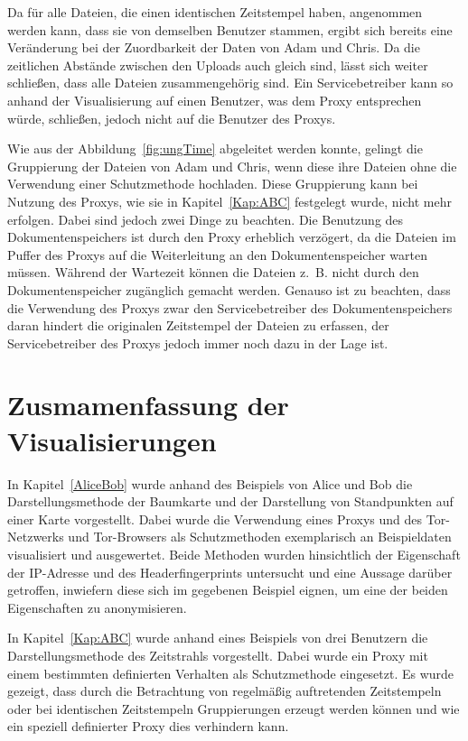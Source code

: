 \documentclass[
    fontsize=12pt,
    headings=small,
    parskip=half,           %
    bibliography=totoc,
    numbers=noenddot,       %
    open=any,               %
    ]{scrreprt}
\begin{document}
Da für alle Dateien, die einen identischen Zeitstempel haben, angenommen werden kann, dass sie von demselben Benutzer stammen, ergibt sich bereits eine Veränderung bei der Zuordbarkeit der Daten von Adam und Chris.
Da die zeitlichen Abstände zwischen den Uploads auch gleich sind, lässt sich weiter schließen, dass alle Dateien zusammengehörig sind.
Ein Servicebetreiber kann so anhand der Visualisierung auf einen Benutzer, was dem Proxy entsprechen würde, schließen, jedoch nicht auf die Benutzer des Proxys.

Wie aus der Abbildung~\ref{fig:ungTime} abgeleitet werden konnte, gelingt die Gruppierung der Dateien von Adam und Chris, wenn diese ihre Dateien ohne die Verwendung einer Schutzmethode hochladen.
Diese Gruppierung kann bei Nutzung des Proxys, wie sie in Kapitel~\ref{Kap:ABC} festgelegt wurde, nicht mehr erfolgen.
Dabei sind jedoch zwei Dinge zu beachten. 
Die Benutzung des Dokumentenspeichers ist durch den Proxy erheblich verzögert, da die Dateien im Puffer des Proxys auf die Weiterleitung an den Dokumentenspeicher warten müssen.
Während der Wartezeit können die Dateien z.~B. nicht durch den Dokumentenspeicher zugänglich gemacht werden.
Genauso ist zu beachten, dass die Verwendung des Proxys zwar den Servicebetreiber des Dokumentenspeichers daran hindert die originalen Zeitstempel der Dateien zu erfassen, der Servicebetreiber des Proxys jedoch immer noch dazu in der Lage ist.

\section{Zusmamenfassung der Visualisierungen}
In Kapitel~\ref{AliceBob} wurde anhand des Beispiels von Alice und Bob die Darstellungsmethode der Baumkarte und der Darstellung von Standpunkten auf einer Karte vorgestellt.
Dabei wurde die Verwendung eines Proxys und des Tor-Netzwerks und Tor-Browsers als Schutzmethoden exemplarisch an Beispieldaten visualisiert und ausgewertet.
Beide Methoden wurden hinsichtlich der Eigenschaft der IP-Adresse und des Headerfingerprints untersucht und eine Aussage darüber getroffen, inwiefern diese sich im gegebenen Beispiel eignen, um eine der beiden Eigenschaften zu anonymisieren.

In Kapitel~\ref{Kap:ABC} wurde anhand eines Beispiels von drei Benutzern die Darstellungsmethode des Zeitstrahls vorgestellt.
Dabei wurde ein Proxy mit einem bestimmten definierten Verhalten als Schutzmethode eingesetzt.
Es wurde gezeigt, dass durch die Betrachtung von regelmäßig auftretenden Zeitstempeln oder bei identischen Zeitstempeln Gruppierungen erzeugt werden können und wie ein speziell definierter Proxy dies verhindern kann.
\end{document}
